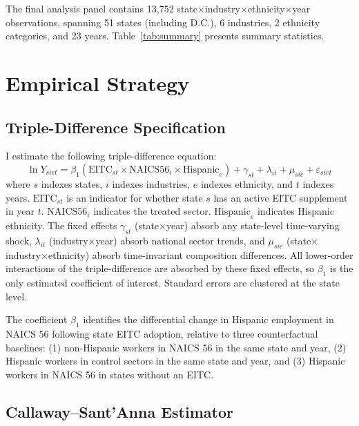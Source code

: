 \documentclass[12pt]{article}
\begin{document}
The final analysis panel contains 13{,}752 state$\times$industry$\times$ethnicity$\times$year observations, spanning 51 states (including D.C.), 6 industries, 2 ethnicity categories, and 23 years. Table~\ref{tab:summary} presents summary statistics.



\section{Empirical Strategy}

\subsection{Triple-Difference Specification}

I estimate the following triple-difference equation:
\begin{equation}
\label{eq:main}
\ln Y_{siet} = \beta_1 (\text{EITC}_{st} \times \text{NAICS56}_i \times \text{Hispanic}_e) + \gamma_{st} + \lambda_{it} + \mu_{sie} + \varepsilon_{siet}
\end{equation}
where $s$ indexes states, $i$ indexes industries, $e$ indexes ethnicity, and $t$ indexes years. $\text{EITC}_{st}$ is an indicator for whether state $s$ has an active EITC supplement in year $t$. $\text{NAICS56}_i$ indicates the treated sector. $\text{Hispanic}_e$ indicates Hispanic ethnicity. The fixed effects $\gamma_{st}$ (state$\times$year) absorb any state-level time-varying shock, $\lambda_{it}$ (industry$\times$year) absorb national sector trends, and $\mu_{sie}$ (state$\times$industry$\times$ethnicity) absorb time-invariant composition differences. All lower-order interactions of the triple-difference are absorbed by these fixed effects, so $\beta_1$ is the only estimated coefficient of interest. Standard errors are clustered at the state level.

The coefficient $\beta_1$ identifies the differential change in Hispanic employment in NAICS 56 following state EITC adoption, relative to three counterfactual baselines: (1) non-Hispanic workers in NAICS 56 in the same state and year, (2) Hispanic workers in control sectors in the same state and year, and (3) Hispanic workers in NAICS 56 in states without an EITC.

\subsection{Callaway--Sant'Anna Estimator}
\end{document}
